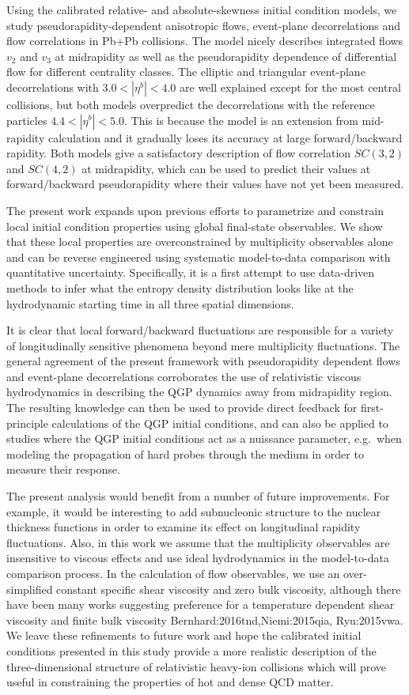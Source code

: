 Using the calibrated relative- and absolute-skewness initial condition models, we study pseudorapidity-dependent anisotropic flows, event-plane decorrelations and flow correlations in Pb+Pb collisions.
The model nicely describes integrated flows $v_2$ and $v_3$ at midrapidity as well as the pseudorapidity dependence of differential flow for different centrality classes.
The elliptic and triangular event-plane decorrelations with $3.0 < |\eta^b| < 4.0$ are well explained except for the most central collisions, but both models overpredict the decorrelations with the reference particles $4.4 < |\eta^b| < 5.0$.
This is because the model is an extension from mid-rapidity calculation and it gradually loses its accuracy at large forward/backward rapidity.
Both models give a satisfactory description of flow correlation $SC(3,2)$ and $SC(4,2)$ at midrapidity, which can be used to predict their values at forward/backward pseudorapidity where their values have not yet been measured.

The present work expands upon previous efforts to parametrize and constrain local initial condition properties using global final-state observables.
We show that these local properties are overconstrained by multiplicity observables alone and can be reverse engineered using systematic model-to-data comparison with quantitative uncertainty.
Specifically, it is a first attempt to use data-driven methods to infer what the entropy density distribution looks like at the hydrodynamic starting time in all three spatial dimensions.

It is clear that local forward/backward fluctuations are responsible for a variety of longitudinally sensitive phenomena beyond mere multiplicity fluctuations.
The general agreement of the present framework with pseudorapidity dependent flows and event-plane decorrelations corroborates the use of relativistic viscous hydrodynamics in describing the QGP dynamics away from midrapidity region.
The resulting knowledge can then be used to provide direct feedback for first-principle calculations of the QGP initial conditions, and can also be applied to studies where the QGP initial conditions act as a nuissance parameter, e.g.\ when modeling the propagation of hard probes through the medium in order to measure their response.

The present analysis would benefit from a number of future improvements.
For example, it would be interesting to add subnucleonic structure to the nuclear thickness functions in order to examine its effect on longitudinal rapidity fluctuations.
Also, in this work we assume that the multiplicity observables are insensitive to viscous effects and use ideal hydrodynamics in the model-to-data comparison process.
In the calculation of flow observables, we use an over-simplified constant specific shear viscosity and zero bulk viscosity, although there have been many works suggesting preference for a temperature dependent shear viscosity and finite bulk viscosity {Bernhard:2016tnd,Niemi:2015qia, Ryu:2015vwa}.
We leave these refinements to future work and hope the calibrated initial conditions presented in this study provide a more realistic description of the three-dimensional structure of relativistic heavy-ion collisions which will prove useful in constraining the properties of hot and dense QCD matter.